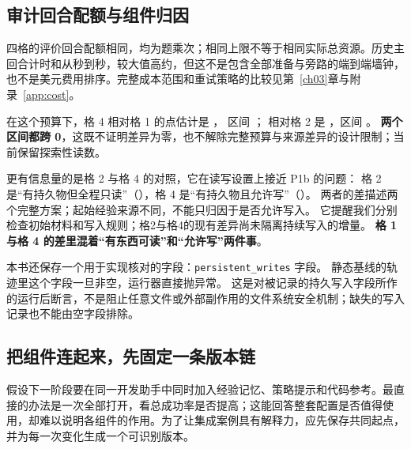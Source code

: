 \subsection{审计回合配额与组件归因}
\label{sec:ch15-ablation}

\begin{sloppypar}
四格的评价回合配额相同，均为题乘次；相同上限不等于相同实际总资源。历史主回合计时和从秒到秒，较大值高约，但这不是包含全部准备与旁路的端到端墙钟，也不是美元费用排序。完整成本范围和重试策略的比较见第~\ref{ch03}章与附录~\ref{app:cost}。\end{sloppypar}

\begin{sloppypar}
在这个预算下，格 4 相对格 1 的点估计是 ，
区间 \measured{$[-0.1000, +0.1750]$}；
相对格 2 是 ，区间 \measured{$[-0.1375, +0.2750]$}。
\textbf{两个区间都跨 0}，这既不证明差异为零，也不解除完整预算与来源差异的设计限制；当前保留探索性读数。
\end{sloppypar}

\begin{sloppypar}
更有信息量的是格 2 与格 4 的对照，它在读写设置上接近 P1b 的问题：
格 2 是“有持久物但全程只读”（），格 4 是“有持久物且允许写”（）。
两者的差描述两个完整方案；起始经验来源不同，不能只归因于是否允许写入。
它提醒我们分别检查初始材料和写入规则；格2与格4的现有差异尚未隔离持续写入的增量。
\textbf{格 1 与格 4 的差里混着“有东西可读”和“允许写”两件事}。
\end{sloppypar}

\begin{sloppypar}
本书还保存一个用于实现核对的字段：\texttt{persistent\_writes} 字段。
静态基线的轨迹里这个字段一旦非空，运行器直接抛异常。
这是对被记录的持久写入字段所作的运行后断言，不是阻止任意文件或外部副作用的文件系统安全机制；缺失的写入记录也不能由空字段排除。
\end{sloppypar}

\subsection{把组件连起来，先固定一条版本链}
\label{sec:ch15-versionchain}

假设下一阶段要在同一开发助手中同时加入经验记忆、策略提示和代码参考。最直接的办法是一次全部打开，看总成功率是否提高；这能回答整套配置是否值得使用，却难以说明各组件的作用。为了让集成案例具有解释力，应先保存共同起点，并为每一次变化生成一个可识别版本。

